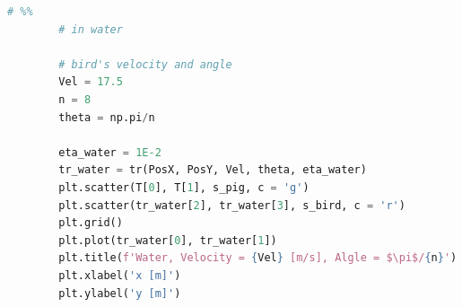 \documentclass[12pt]{article}
\begin{document}
\begin{lstlisting}[language={Python}]
        # %%
        # in water
        
        # bird's velocity and angle
        Vel = 17.5
        n = 8
        theta = np.pi/n
        
        eta_water = 1E-2
        tr_water = tr(PosX, PosY, Vel, theta, eta_water)
        plt.scatter(T[0], T[1], s_pig, c = 'g')
        plt.scatter(tr_water[2], tr_water[3], s_bird, c = 'r')
        plt.grid()
        plt.plot(tr_water[0], tr_water[1])
        plt.title(f'Water, Velocity = {Vel} [m/s], Algle = $\pi$/{n}')
        plt.xlabel('x [m]')
        plt.ylabel('y [m]')
      \end{lstlisting}
      
\end{document}
